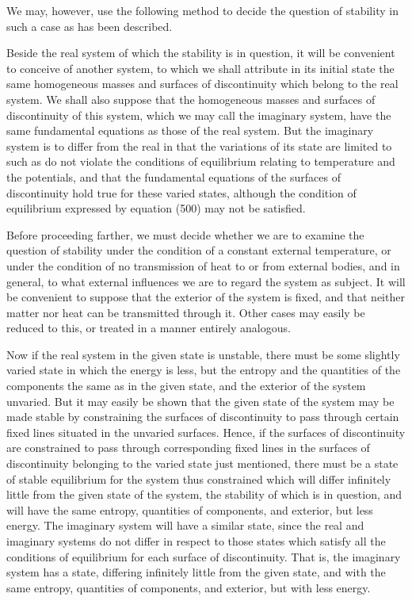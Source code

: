 \documentclass[12pt]{memoir}
\begin{document}
{We may, however, use the following method to decide the question of stability in such a case as has been described.

Beside the real system of which the stability is in question, it will be convenient to conceive of another system, to which we shall attribute in its initial state the same homogeneous masses and surfaces of discontinuity which belong to the real system. We shall also suppose that the homogeneous masses and surfaces of discontinuity of this system, which we may call the imaginary system, have the same fundamental equations as those of the real system. But the imaginary system is to differ from the real in that the variations of its state are limited to such as do not violate the conditions of equilibrium relating to temperature and the potentials, and that the fundamental equations of the surfaces of discontinuity hold true for these varied states, although the condition of equilibrium expressed by equation (500) may not be satisfied.

Before proceeding farther, we must decide whether we are to examine the question of stability under the condition of a constant external temperature, or under the condition of no transmission of heat to or from external bodies, and in general, to what external influences we are to regard the system as subject. It will be convenient to suppose that the exterior of the system is fixed, and that neither matter nor heat can be transmitted through it. Other cases may easily be reduced to this, or treated in a manner entirely analogous.

Now if the real system in the given state is unstable, there must be some slightly varied state in which the energy is less, but the entropy and the quantities of the components the same as in the given state, and the exterior of the system unvaried. But it may easily be shown that the given state of the system may be made stable by constraining the surfaces of discontinuity to pass through certain fixed lines situated in the unvaried surfaces. Hence, if the surfaces of discontinuity are constrained to pass through corresponding fixed lines in the surfaces of discontinuity belonging to the varied state just mentioned, there must be a state of stable equilibrium for the system thus constrained which will differ infinitely little from the given state of the system, the stability of which is in question, and will have the same entropy, quantities of components, and exterior, but less energy. The imaginary system will have a similar state, since the real and imaginary systems do not differ in respect to those states which satisfy all the conditions of equilibrium for each surface of discontinuity. That is, the imaginary system has a state, differing infinitely little from the given state, and with the same entropy, quantities of components, and exterior, but with less energy.

}
\end{document}

